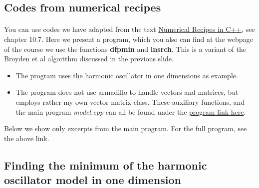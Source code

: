 \documentclass[%
oneside,                 %
final,                   %
10pt]{article}
\begin{document}
\subsection*{Codes from numerical recipes}

\paragraph{}
You can use codes we have adapted from the text \href{{http://www.nr.com/}}{Numerical Recipes in C++}, see chapter 10.7.  
Here we present a program, which you also can find at the webpage of the course we use the functions \textbf{dfpmin} and \textbf{lnsrch}.  This is a variant of the Broyden et al algorithm discussed in the previous slide.

\begin{itemize}
\item The program uses the harmonic oscillator in one dimensions as example.

\item The program does not use armadillo to handle vectors and matrices, but employs rather my own vector-matrix class. These auxiliary functions, and the main program \emph{model.cpp} can all be found under the \href{{https://github.com/CompPhysics/ComputationalPhysics2/tree/gh-pages/doc/pub/cg/programs/c%
\end{itemize}

\noindent
Below we show only excerpts from the main program. For the full program, see the above link.



\subsection*{Finding the minimum of the harmonic oscillator model in one dimension}

\paragraph{}
\end{document}
